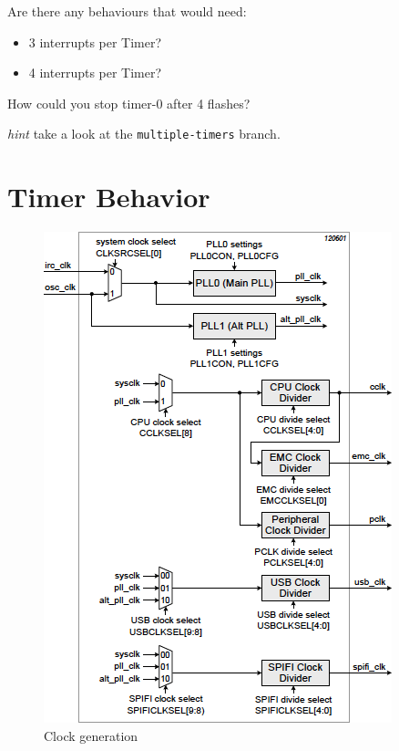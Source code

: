 \documentclass[a4paper]{tufte-handout}
\begin{document}
\begin{question}{}{}
  Are there any behaviours that would need:
  \begin{itemize}
  \item 3 interrupts per Timer?
  \item 4 interrupts per Timer?
  \end{itemize}
\end{question}

\begin{question}{}{}
  How could you stop timer-0 after 4 flashes?

  \emph{hint} take a look at the \texttt{multiple-timers} branch.
\end{question}




\clearpage
\appendix
\section{Timer Behavior}\label{sec:timer-behavior}
\begin{figure}
\includegraphics[scale=0.65]{clock-gen}
  \caption{Clock generation}
  \label{fig:clockgeneration}
\end{figure}
\end{document}
